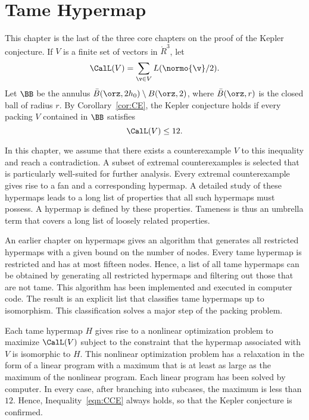 

\chapter{Tame Hypermap}
%

\label{sec:tame}
%

\begin{summary}
  This chapter is the last of the three core chapters on the
 proof of the Kepler conjecture.  If $V$ is a finite set of
  vectors in $\ring{R}^3$, let
  \[ \CalL(V) = \sum_{\v\in V}
    L(\normo{\v}/2).\] 
Let $\BB$ be the
annulus $\bar B(\orz,2h_0)\setminus B(\orz,2)$, where
$\bar B(\orz,r)$ is the closed ball of radius $r$.
By Corollary~\ref{cor:CE},  the Kepler conjecture holds
 if every packing $V$
contained in $\BB$
satisfies
\begin{equation}\label{eqn:CCE}
\CalL(V) \le 12.
\end{equation}
%

In this chapter, we assume that there exists a counterexample $V$ to this
inequality and reach a contradiction.  A subset of extremal
counterexamples  is selected that is particularly well-suited for
further analysis.  Every extremal counterexample gives rise to a fan
and a corresponding hypermap.  A detailed study of these hypermaps
leads to a long list of properties that all such hypermaps must
possess.  A  hypermap is defined by these properties.  Tameness is thus an
umbrella term that covers a long list of loosely related properties.

An earlier chapter on hypermaps gives an algorithm that generates all
restricted hypermaps with a given bound on the number of nodes.
Every tame hypermap is restricted and has at most fifteen nodes.  Hence, a
list of all tame hypermaps can be obtained by generating all
restricted hypermaps and filtering out those that are not tame.  This
algorithm has been implemented and executed in computer code.  The result
 is an explicit list that classifies tame hypermaps
up to isomorphism.  This classification solves a major step of the
packing problem.

Each tame hypermap $H$ gives rise to a nonlinear optimization problem to
maximize $\CalL(V)$ subject to the constraint that the hypermap
associated with $V$ is isomorphic to $H$.  This nonlinear optimization
problem has a relaxation in the form of a linear program with a maximum that
 is at least as large as the maximum of the nonlinear program.
Each linear program has been solved by computer.  In every case, after branching
into subcases, the 
maximum is less than $12$.  Hence, Inequality~\ref{eqn:CCE}
always holds, so that the Kepler conjecture is confirmed.
\end{summary}
%
%



